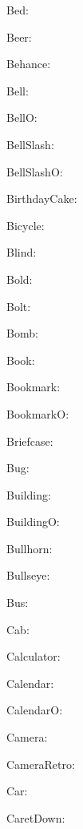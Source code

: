 \documentclass{article}
\begin{document}
      Bed: \faBed\ 

      Beer: \faBeer\ 

      Behance: \faBehance\ 

      Bell: \faBell\ 

      BellO: \faBellO\ 

      BellSlash: \faBellSlash\ 

      BellSlashO: \faBellSlashO\ 

      BirthdayCake: \faBirthdayCake\ 

      Bicycle: \faBicycle\ 

      Blind: \faBlind\ 

      Bold: \faBold\ 

      Bolt: \faBolt\ 

      Bomb: \faBomb\ 

      Book: \faBook\ 

      Bookmark: \faBookmark\ 

      BookmarkO: \faBookmarkO\ 

      Briefcase: \faBriefcase\ 

      Bug: \faBug\ 

      Building: \faBuilding\ 

      BuildingO: \faBuildingO\ 

      Bullhorn: \faBullhorn\ 

      Bullseye: \faBullseye\ 

      Bus: \faBus\ 

      Cab: \faCab\ 

      Calculator: \faCalculator\ 

      Calendar: \faCalendar\ 

      CalendarO: \faCalendarO\ 

      Camera: \faCamera\ 

      CameraRetro: \faCameraRetro\ 

      Car: \faCar\ 

      CaretDown: \faCaretDown\ 
\end{document}
